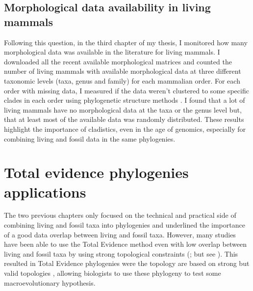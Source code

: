 \subsection{Morphological data availability in living mammals}
Following this question, in the third chapter of my thesis, I monitored how many morphological data was available in the literature for living mammals.
I downloaded all the recent available morphological matrices and counted the number of living mammals with available morphological data at three different taxonomic levels (taxa, genus and family) for each mammalian order.
For each order with missing data, I measured if the data weren't clustered to some specific clades in each order using phylogenetic structure methods \citep{webb2002phylogenies}.
I found that a lot of living mammals have no morphological data at the taxa or the genus level but, that at least most of the available data was randomly distributed.
These results highlight the importance of cladistics, even in the age of genomics, especially for combining living and fossil data in the same phylogenies.

\section{Total evidence phylogenies applications}
The two previous chapters only focused on the technical and practical side of combining living and fossil taxa into phylogenies and underlined the importance of a good data overlap between living and fossil taxa.
However, many studies have been able to use the Total Evidence method even with low overlap between living and fossil taxa by using strong topological constraints (\citealt{ronquista2012,schragocombining2013,slaterphylogenetic2013,beckancient2014}; but see \citealt{Arcila2015131,Dembo2015}).
This resulted in Total Evidence phylogenies were the topology are based on strong but valid  topologies \citep[e.g. based on][for mammals]{meredithimpacts2011}, allowing biologists to use these phylogeny to test some macroevolutionary hypothesis.

